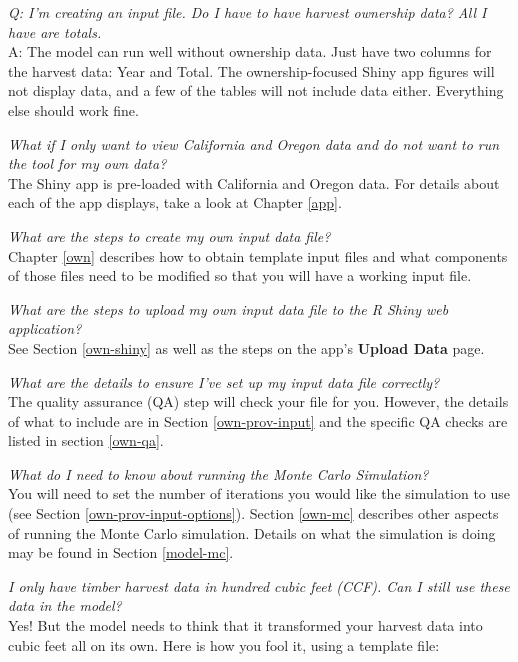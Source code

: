 \documentclass[
  openany]{book}
\begin{document}
\emph{Q: I'm creating an input file. Do I have to have harvest ownership data? All I have are totals.}\\
A: The model can run well without ownership data. Just have two columns for the harvest data: Year and Total. The ownership-focused Shiny app figures will not display data, and a few of the tables will not include data either. Everything else should work fine.

\emph{What if I only want to view California and Oregon data and do not want to run the tool for my own data?}\\
The Shiny app is pre-loaded with California and Oregon data. For details about each of the app displays, take a look at Chapter \ref{app}.

\emph{What are the steps to create my own input data file?}\\
Chapter \ref{own} describes how to obtain template input files and what components of those files need to be modified so that you will have a working input file.

\emph{What are the steps to upload my own input data file to the R Shiny web application?}\\
See Section \ref{own-shiny} as well as the steps on the app's \textbf{Upload Data} page.

\emph{What are the details to ensure I've set up my input data file correctly? }\\
The quality assurance (QA) step will check your file for you. However, the details of what to include are in Section \ref{own-prov-input} and the specific QA checks are listed in section \ref{own-qa}.

\emph{What do I need to know about running the Monte Carlo Simulation? }\\
You will need to set the number of iterations you would like the simulation to use (see Section \ref{own-prov-input-options}). Section \ref{own-mc} describes other aspects of running the Monte Carlo simulation. Details on what the simulation is doing may be found in Section \ref{model-mc}.

\emph{I only have timber harvest data in hundred cubic feet (CCF). Can I still use these data in the model?}\\
Yes! But the model needs to think that it transformed your harvest data into cubic feet all on its own. Here is how you fool it, using a template file:
\end{document}
